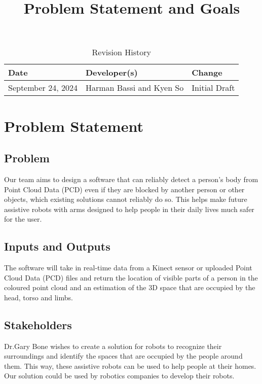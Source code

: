 \documentclass{article}
\title{Problem Statement and Goals\\\progname}
\author{\authname}
\date{}
\begin{document}
\maketitle

\begin{table}[hp]
\caption{Revision History} \label{TblRevisionHistory}
\begin{tabularx}{\textwidth}{llX}
\toprule
\textbf{Date} & \textbf{Developer(s)} & \textbf{Change}\\
\midrule
September 24, 2024 & Harman Bassi and Kyen So & Initial Draft\\
\bottomrule
\end{tabularx}
\end{table}

\newpage

\section{Problem Statement}

\subsection{Problem}
Our team aims to design a software that can reliably detect a person’s body from Point Cloud Data (PCD) even if they are blocked by another person or other objects, which existing solutions cannot reliably do so. This helps make future assistive robots with arms designed to help people in their daily lives much safer for the user.

\subsection{Inputs and Outputs}
The software will take in real-time data from a Kinect sensor or uploaded Point Cloud Data (PCD) files and return the location of visible parts of a person in the coloured point cloud and an estimation of the 3D space that are occupied by the head, torso and limbs.

\subsection{Stakeholders}
Dr.Gary Bone wishes to create a solution for robots to recognize their surroundings and identify the spaces that are occupied by the people around them. This way, these assistive robots can be used to help people at their homes. Our solution could be used by robotics companies to develop their robots.
\end{document}
